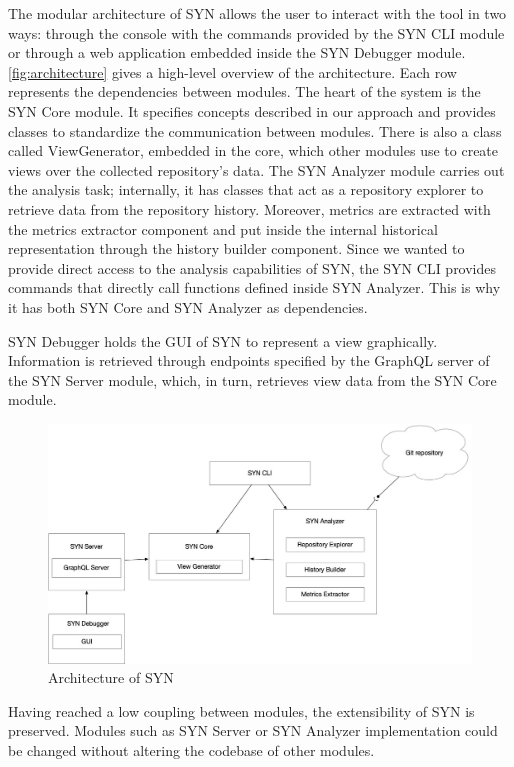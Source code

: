 The modular architecture of SYN allows the user to interact with the tool in two ways: through the console with the commands provided by the SYN CLI module 
or through a web application embedded inside the SYN Debugger module. \\
\autoref{fig:architecture} gives a high-level overview of the architecture. Each row represents the dependencies between modules.
The heart of the system is the SYN Core module. It specifies concepts described in our approach and provides classes to standardize the communication between modules.
There is also a class called ViewGenerator, embedded in the core, which other modules use to create views over the collected repository's data.
The SYN Analyzer module carries out the analysis task; internally, it has classes that act as a repository explorer to retrieve data from the repository history. 
Moreover, metrics are extracted with the metrics extractor component and put inside the internal historical representation through the history builder component. 
Since we wanted to provide direct access to the analysis capabilities of SYN, the SYN CLI provides commands that directly call functions defined inside SYN Analyzer. 
This is why it has both SYN Core and SYN Analyzer as dependencies. 

SYN Debugger holds the GUI of SYN to represent a view graphically. Information is retrieved through endpoints specified by the GraphQL server of the SYN Server module, which, in turn, retrieves view data from the SYN Core module. 


\begin{figure}
    \center
    \includegraphics[width=\textwidth]{SYNArchitecture.jpg}
    \caption{Architecture of SYN}
    \label{fig:architecture}
\end{figure}

Having reached a low coupling between modules, the extensibility of SYN is preserved. Modules such as SYN Server or SYN Analyzer implementation could be changed without altering the codebase of other modules. 

